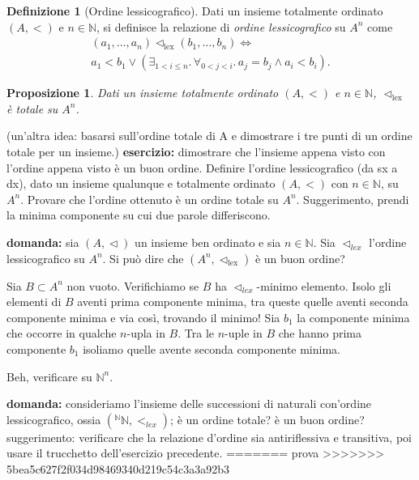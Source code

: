 \documentclass[fontsize = 11 pt, paper=A4, oneside, index=totoc, hyperref]{book}
\theoremstyle{definition}
\newtheorem{dfn}{Definizione}[]
\theoremstyle{plain}
\newtheorem{prp}{Proposizione}[section]
\newcommand{\N}{\mathbb{N}}
\newcommand{\order}{\vartriangleleft}
\newcommand{\ordine}[1]{\vartriangleleft_{\mathrm{#1}}}
\begin{document}
\begin{dfn}[Ordine lessicografico]
  Dati un insieme totalmente ordinato \((A,<)\) e \(n \in \N\), si definisce la relazione di \emph{ordine lessicografico} su \(A^n\) come
  \begin{multline}
    (a_1,\dots,a_n) \ordine{lex} (b_1,\dots,b_n) \iff \\ a_1 < b_1 \lor \left( \exists_{1 < i \le n}.\, \forall_{0 < j < i}.\, a_j = b_j \land a_i < b_i\right).
  \end{multline}
\end{dfn}
\begin{prp}
  Dati un insieme totalmente ordinato \((A, <)\) e \(n \in \N\), \(\ordine{lex}\) è totale su \(A^n\).
\end{prp}
(un'altra idea: basarsi sull'ordine totale di A e dimostrare i tre punti di un ordine totale per un insieme.)
{\bf esercizio:} dimostrare che l'insieme appena visto con l'ordine appena visto è un buon ordine. Definire l'ordine lessicografico (da sx a dx), dato un insieme qualunque e totalmente ordinato \((A, <)\) con \(n \in \N\), su \(A^n\). Provare che l'ordine ottenuto è un ordine totale su \(A^n\). Suggerimento, prendi la minima componente su cui due parole differiscono.

{\bf domanda:} sia \((A, \order)\) un insieme ben ordinato e sia \(n \in \N\). Sia \(\order_{lex}\) l'ordine lessicografico su \(A^n\). Si può dire che \((A^n, \ordine{lex})\) è un buon ordine?

Sia \(B \subset A^n\) non vuoto. Verifichiamo se \(B\) ha \(\order_{lex}\)-minimo elemento. Isolo gli elementi di \(B\) aventi prima componente minima, tra queste quelle aventi seconda componente minima e via così, trovando il minimo! Sia \(b_1\) la componente minima che occorre in qualche \(n\)-upla in \(B\). Tra le \(n\)-uple in \(B\) che hanno prima componente \(b_1\) isoliamo quelle avente seconda componente minima.

Beh, verificare su \(\N^n\).

{\bf domanda:} consideriamo l'insieme delle successioni di naturali con'ordine lessicografico, ossia \(({}^\N\N, <_{lex})\); è un ordine totale? è un buon ordine? suggerimento: verificare che la relazione d'ordine sia antiriflessiva e transitiva, poi usare il trucchetto dell'esercizio precedente.
=======
prova
>>>>>>> 5bea5c627f2f034d98469340d219c54c3a3a92b3
\end{document}
